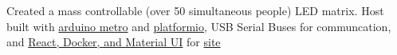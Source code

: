 {Created a mass controllable (over 50 simultaneous people) LED matrix. Host built with \href{https://www.adafruit.com/product/2488}{arduino metro} and \href{https://platformio.org/}{platformio}, USB Serial Buses for communcation, and \href{https://github.com/sachiniyer/control_display/tree/main/control_display_site}{React, Docker, and Material UI} for \href{https://school-demo.sachiniyer.com/}{site}}
